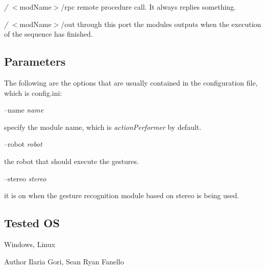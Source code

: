 \begin{DoxyItemize}
\item {\itshape /} $<$mod\+Name$>$/rpc remote procedure call. It always replies something.
\item {\itshape /} $<$mod\+Name$>$/out through this port the modules outputs when the execution of the sequence has finished.
\end{DoxyItemize}\hypertarget{group__gestureRecognitionStereo_parameters_sec}{}\subsection{Parameters}\label{group__gestureRecognitionStereo_parameters_sec}
The following are the options that are usually contained in the configuration file, which is config.\+ini\+:

--name {\itshape name} 
\begin{DoxyItemize}
\item specify the module name, which is {\itshape action\+Performer} by default.
\end{DoxyItemize}

--robot {\itshape robot} 
\begin{DoxyItemize}
\item the robot that should execute the gestures.
\end{DoxyItemize}

--stereo {\itshape stereo} 
\begin{DoxyItemize}
\item it is on when the gesture recognition module based on stereo is being used.
\end{DoxyItemize}\hypertarget{group__gestureRecognitionStereo_tested_os_sec}{}\subsection{Tested OS}\label{group__gestureRecognitionStereo_tested_os_sec}
Windows, Linux

\begin{DoxyAuthor}{Author}
Ilaria Gori, Sean Ryan Fanello 
\end{DoxyAuthor}
